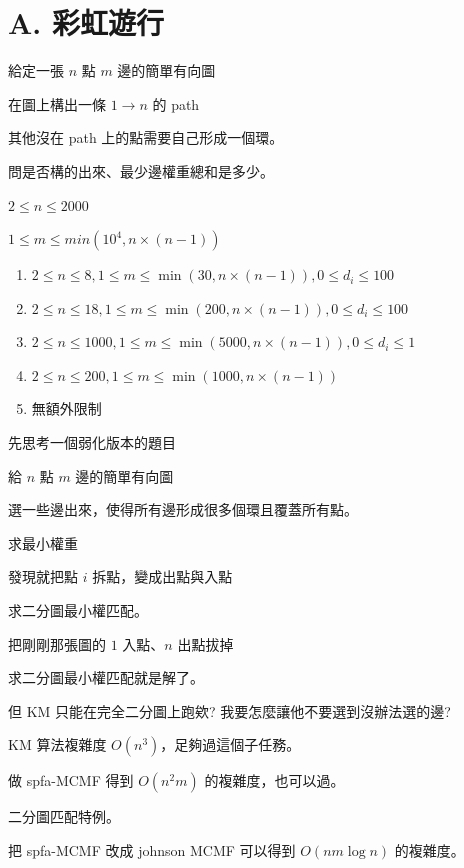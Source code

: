 \section{A. 彩虹遊行}

\begin{frame}{}
    給定一張 $n$ 點 $m$ 邊的簡單有向圖

    在圖上構出一條 $1 \to n$ 的 path

    其他沒在 path 上的點需要自己形成一個環。

    問是否構的出來、最少邊權重總和是多少。

    $2 \le n \le 2000$

    $1 \le m \le min(10^4, n \times (n-1))$
\end{frame}

\begin{frame}{}
    \begin{enumerate}
        \item{$2 \le n \le 8, 1 \le m \le \min(30, n \times (n-1)), 0 \le d_i \le 100$}
        \item{$2 \le n \le 18, 1 \le m \le \min(200, n \times (n-1)), 0 \le d_i \le 100$}
        \item{$2 \le n \le 1000, 1 \le m \le \min(5000, n \times (n-1)), 0 \le d_i \le 1$}
        \item{$2 \le n \le 200, 1 \le m \le \min(1000, n \times (n-1))$}
        \item{無額外限制}
    \end{enumerate}
\end{frame}

\begin{frame}{}
    先思考一個弱化版本的題目

    \begin{problem}
        給 $n$ 點 $m$ 邊的簡單有向圖

        選一些邊出來，使得所有邊形成很多個環且覆蓋所有點。

        求最小權重
    \end{problem}\pause

    發現就把點 $i$ 拆點，變成出點與入點

    求二分圖最小權匹配。
\end{frame}

\begin{frame}{}
    把剛剛那張圖的 $1$ 入點、$n$ 出點拔掉

    求二分圖最小權匹配就是解了。\pause

    但 KM 只能在完全二分圖上跑欸? 我要怎麼讓他不要選到沒辦法選的邊?

    KM 算法複雜度 $O(n^3)$，足夠過這個子任務。

    做 spfa-MCMF 得到 $O(n^2 m)$ 的複雜度，也可以過。
\end{frame}

\begin{frame}{}
    二分圖匹配特例。
\end{frame}

\begin{frame}{}
    把 spfa-MCMF 改成 johnson MCMF 可以得到 $O(n m \log n)$ 的複雜度。
\end{frame}
